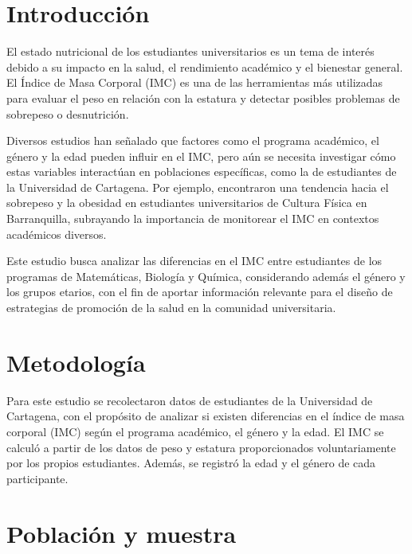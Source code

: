 \documentclass{rapport}
\begin{document}
\section*{Introducción}

El estado nutricional de los estudiantes universitarios es un tema de interés debido a su impacto en la salud, el rendimiento académico y el bienestar general. El Índice de Masa Corporal (IMC) es una de las herramientas más utilizadas para evaluar el peso en relación con la estatura y detectar posibles problemas de sobrepeso o desnutrición. 

\vspace{0.5cm}

Diversos estudios han señalado que factores como el programa académico, el género y la edad pueden influir en el IMC, pero aún se necesita investigar cómo estas variables interactúan en poblaciones específicas, como la de estudiantes de la Universidad de Cartagena. Por ejemplo, \textcite{nieto2021habitos} encontraron una tendencia hacia el sobrepeso y la obesidad en estudiantes universitarios de Cultura Física en Barranquilla, subrayando la importancia de monitorear el IMC en contextos académicos diversos.

\vspace{0.5cm}

Este estudio busca analizar las diferencias en el IMC entre estudiantes de los programas de Matemáticas, Biología y Química, considerando además el género y los grupos etarios, con el fin de aportar información relevante para el diseño de estrategias de promoción de la salud en la comunidad universitaria.


\newpage

\section{Metodología}

Para este estudio se recolectaron datos de estudiantes de la Universidad de Cartagena, con el propósito de analizar si existen diferencias en el índice de masa corporal (IMC) según el programa académico, el género y la edad. El IMC se calculó a partir de los datos de peso y estatura proporcionados voluntariamente por los propios estudiantes. Además, se registró la edad y el género de cada participante.



\section{Población y muestra}
\end{document}
